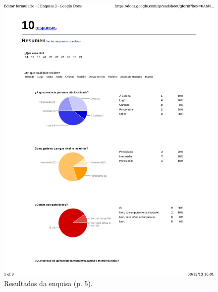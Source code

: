 \begin{figure}
 \centering
 \includegraphics[scale=0.7,page=5,keepaspectratio=true,clip,trim=0cm 0.5cm 0cm 0.5cm]{./imagenes/enquisa.pdf}
 \caption{Resultados da enquisa (p. 5).}
 \label{figura:ResultadosEnquisa5}
\end{figure}

